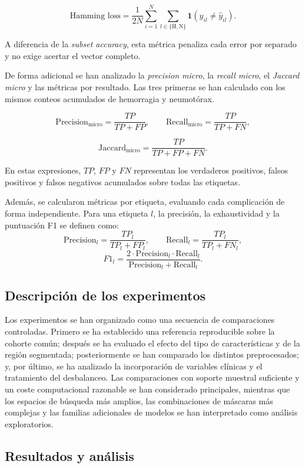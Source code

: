\[
\text{Hamming loss} = \frac{1}{2N}\sum_{i=1}^{N}\sum_{l \in \{\mathrm{H},\mathrm{N}\}}\mathbf{1}(y_{il} \neq \hat{y}_{il}).
\]

A diferencia de la \textit{subset accuracy}, esta métrica penaliza cada error por separado y no exige acertar el vector completo.

De forma adicional se han analizado la \textit{precision micro}, la \textit{recall micro}, el \textit{Jaccard micro} y las métricas por resultado. Las tres primeras se han calculado con los mismos conteos acumulados de hemorragia y neumotórax.

\[
\text{Precision}_{\text{micro}} = \frac{TP}{TP + FP}, \qquad
\text{Recall}_{\text{micro}} = \frac{TP}{TP + FN},
\]

\[
\text{Jaccard}_{\text{micro}} = \frac{TP}{TP + FP + FN}.
\]


En estas expresiones, \(TP\), \(FP\) y \(FN\) representan los verdaderos positivos, falsos positivos y falsos negativos acumulados sobre todas las etiquetas.

Además, se calcularon métricas por etiqueta, evaluando cada complicación de forma independiente. Para una etiqueta \(l\), la precisión, la exhaustividad y la puntuación F1 se definen como:
\[
\text{Precision}_l = \frac{TP_l}{TP_l + FP_l}, \qquad
\text{Recall}_l = \frac{TP_l}{TP_l + FN_l},
\]
\[
F1_l = \frac{2 \cdot \text{Precision}_l \cdot \text{Recall}_l}{\text{Precision}_l + \text{Recall}_l}.
\]


\subsection{Descripción de los experimentos}

Los experimentos se han organizado como una secuencia de comparaciones controladas. Primero se ha establecido una referencia reproducible sobre la cohorte común; después se ha evaluado el efecto del tipo de características y de la región segmentada; posteriormente se han comparado los distintos preprocesados; y, por último, se ha analizado la incorporación de variables clínicas y el tratamiento del desbalanceo. Las comparaciones con soporte muestral suficiente y un coste computacional razonable se han considerado principales, mientras que los espacios de búsqueda más amplios, las combinaciones de máscaras más complejas y las familias adicionales de modelos se han interpretado como análisis exploratorios.

\subsection{Resultados y análisis}

